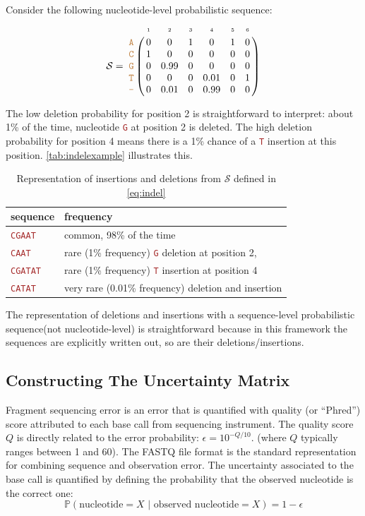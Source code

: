 \documentclass[
]{article}
\newcommand{\sq}[1]{\texttt{\textcolor{brown}{#1}}}
\newcommand{\nps}{\mathcal{S}} %
\newcommand{\nlps}{nucleotide-level probabilistic sequence\xspace}
\newcommand{\slps}{sequence-level probabilistic sequence\xspace}
\newcommand{\pr}[1]{\mathbb{P}(#1)}
\begin{document}
Consider the following \nlps: \begin{equation}
\label{eq:indel}
\nps = 
\bordermatrix{
&\scriptscriptstyle{1} & \scriptscriptstyle{2}& \scriptscriptstyle{3}& \scriptscriptstyle{4} & \scriptscriptstyle{5} & \scriptscriptstyle{6} \cr
\sq{A} & 0 & 0   & 1 & 0    & 1 & 0\cr
\sq{C} & 1 & 0    & 0 & 0    & 0 & 0\cr
\sq{G} & 0 & 0.99 & 0 & 0    & 0 & 0\cr
\sq{T} & 0 & 0    & 0 & 0.01 & 0 & 1\cr
\sq{-} & 0 & 0.01 & 0 & 0.99 & 0 & 0\cr
}
\end{equation}

The low deletion probability for position 2 is straightforward to
interpret: about 1\% of the time, nucleotide \sq{G} at position 2 is
deleted. The high deletion probability for position 4 means there is a
1\% chance of a \sq{T} insertion at this position.
\autoref{tab:indelexample} illustrates this.

\begin{table}[H]
\caption{Representation of insertions and deletions from $\nps$ defined in \eqref{eq:indel}}
\begin{center}
\label{tab:indelexample}
\begin{tabular}{ll}
\hline
\textbf{sequence} & \textbf{frequency} \\
\hline
\sq{CGAAT}  & common, 98\% of the time \\
\sq{CAAT}   & rare (1\% frequency) \sq{G} deletion at position 2,  \\
\sq{CGATAT} & rare (1\% frequency) \sq{T} insertion at position 4 \\
\sq{CATAT} & very rare (0.01\% frequency) deletion and insertion  \\
\hline
\end{tabular}
\end{center}
\end{table}

The representation of deletions and insertions with a \slps (not
nucleotide-level) is straightforward because in this framework the
sequences are explicitly written out, so are their deletions/insertions.

\hypertarget{constructing-the-uncertainty-matrix}{%
\subsection{Constructing The Uncertainty
Matrix}\label{constructing-the-uncertainty-matrix}}

Fragment sequencing error is an error that is quantified with quality
(or ``Phred'') score attributed to each base call from sequencing
instrument. The quality score \(Q\) is directly related to the error
probability: \(\epsilon = 10^{-Q/10}\).
\cite{ewingBaseCallingAutomatedSequencer1998} (where \(Q\) typically
ranges between 1 and 60). The FASTQ file format is the standard
representation for combining sequence and observation error. The
uncertainty associated to the base call is quantified by defining the
probability that the observed nucleotide is the correct one:
\begin{equation}
\label{eq:basecall}
\pr{\text{nucleotide}=X \,\,|\,\, \text{observed nucleotide} = X} = 1 - \epsilon
\end{equation}
\end{document}
